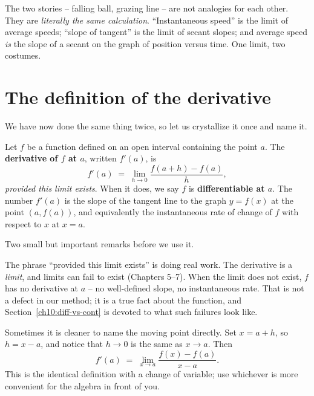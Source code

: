 The two stories -- falling ball, grazing line -- are not analogies for each other.
They are \emph{literally the same calculation}. ``Instantaneous speed'' is the
limit of average speeds; ``slope of tangent'' is the limit of secant slopes; and
average speed \emph{is} the slope of a secant on the graph of position versus time.
One limit, two costumes.

\section{The definition of the derivative}
\label{ch10:def}

We have now done the same thing twice, so let us crystallize it once and name it.

\begin{definition}
\label{ch10:def-derivative}
Let $f$ be a function defined on an open interval containing the point $a$. The
\textbf{derivative of $f$ at $a$}, written $f'(a)$, is
\[
  f'(a) \;=\; \lim_{h \to 0} \frac{f(a + h) - f(a)}{h},
\]
\emph{provided this limit exists}. When it does, we say $f$ is
\textbf{differentiable at $a$}. The number $f'(a)$ is the slope of the tangent
line to the graph $y = f(x)$ at the point $(a, f(a))$, and equivalently the
instantaneous rate of change of $f$ with respect to $x$ at $x = a$.
\end{definition}

Two small but important remarks before we use it.

\begin{remark}
The phrase ``provided this limit exists'' is doing real work. The derivative is a
\emph{limit}, and limits can fail to exist (Chapters 5--7). When the limit does
not exist, $f$ has no derivative at $a$ -- no well-defined slope, no instantaneous
rate. That is not a defect in our method; it is a true fact about the function,
and Section~\ref{ch10:diff-vs-cont} is devoted to what such failures look like.
\end{remark}

\begin{remark}
\label{ch10:def-equiv}
Sometimes it is cleaner to name the moving point directly. Set $x = a + h$, so
$h = x - a$, and notice that $h \to 0$ is the same as $x \to a$. Then
\[
  f'(a) \;=\; \lim_{x \to a} \frac{f(x) - f(a)}{x - a}.
\]
This is the identical definition with a change of variable; use whichever is more
convenient for the algebra in front of you.
\end{remark}

